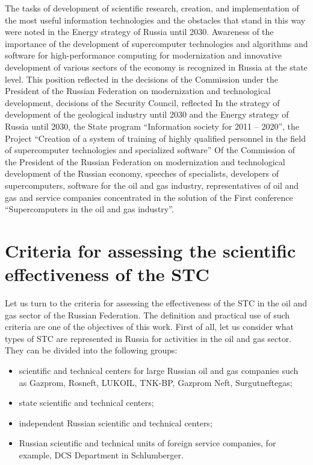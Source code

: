 \documentclass[12pt]{report}
\theoremstyle{definition}
\providecommand{\tightlist}{%
	\setlength{\itemsep}{0pt}\setlength{\parskip}{0pt}}
\begin{document}
The tasks of development of scientific research, creation, and implementation of the most useful information technologies and the obstacles that stand in this way were noted in the Energy strategy of Russia until 2030.
Awareness of the importance of the development of supercomputer technologies and algorithms and software for high-performance computing for modernization and innovative development of various sectors of the economy is recognized in Russia at the state level.
This position reflected in the decisions of the Commission under the President of the Russian Federation on modernization and technological development, decisions of the Security Council, reflected In the strategy of development of the geological industry until 2030 and the Energy strategy of Russia until 2030, the State program ``Information society for 2011 -- 2020'', the Project ``Creation of a system of training of highly qualified personnel in the field of supercomputer technologies and specialized software'' Of the Commission of the President of the Russian Federation on modernization and technological development of the Russian economy, speeches of specialists, developers of supercomputers, software for the oil and gas industry, representatives of oil and gas and service companies concentrated in the solution of the First conference ``Supercomputers in the oil and gas industry''.

\section{Criteria for assessing the scientific effectiveness of the STC}

Let us turn to the criteria for assessing the effectiveness of the STC in the oil and gas sector of the Russian Federation.
The definition and practical use of such criteria are one of the objectives of this work. 
First of all, let us consider what types of STC are represented in Russia for activities in the oil and gas sector.
They can be divided into the following groups:

\begin{itemize} 
	\tightlist
	\item scientific and technical centers for large Russian oil and gas companies such as Gazprom, Rosneft, LUKOIL, TNK-BP, Gazprom Neft, Surgutneftegas; 
	\item state scientific and technical centers; 
	\item independent Russian scientific and technical centers; 
	\item Russian scientific and technical units of foreign service companies, for example, DCS Department in Schlumberger.
\end{itemize}  
\end{document}
